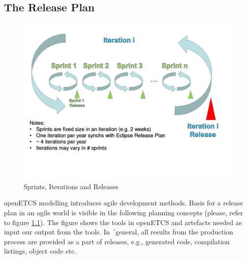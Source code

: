 \documentclass{template/openetcs_report}
\begin{document}
\begin{description}
\chapter{The Release Plan}
\begin{figure}
\includegraphics[width=\textwidth]{figures/iterations.pdf}
\caption{Sprints, Iterations and Releases
\label{f:iteration}}
\end{figure}

openETCS modelling introduces agile development methods. Basis for a release plan in an agile world is visible in the following planning concepts (please, refer to figure \ref{f:iteration}). The figure shows the tools in openETCS and artefacts needed as input our output from the tools. In ´general, all results from the production process are provided as a part of releases, e.g., generated code, compilation listings, object code etc.


\end{description}
\end{document}
